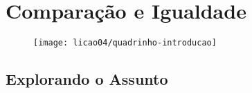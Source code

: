
\chapter{Comparação e Igualdade%
}

\vfill

\begin{figure}[H]
\centering




\texttt{[image: licao04/quadrinho-introducao]}
\end{figure}

\vfill

\clearpage

\section{Explorando o Assunto}

